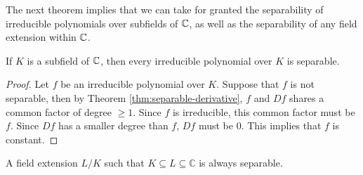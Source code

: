 The next theorem implies that we can take for granted the separability of irreducible polynomials over subfields of $\mathbb C$, as well as the separability of any field extension within $\mathbb C$.


\begin{theorem} \label{thm:separable-poly-in-C}
    If $K$ is a subfield of $\mathbb C$, then every irreducible polynomial over $K$ is separable. 
\end{theorem}

\begin{proof}
    Let $f$ be an irreducible polynomial over $K$. Suppose that $f$ is not separable, then by Theorem \ref{thm:separable-derivative}, $f$ and $Df$ shares a common factor of degree $\ge 1$. Since $f$ is irreducible, this common factor must be $f$. Since $Df$ has a smaller degree than $f$, $Df$ must be $0$. This implies that $f$ is constant.
\end{proof}


\begin{corollary} \label{thm:separable-extension-in-C}
    A field extension $L/K$ such that $K \subseteq L \subseteq \mathbb C$ is always separable. 
\end{corollary}


